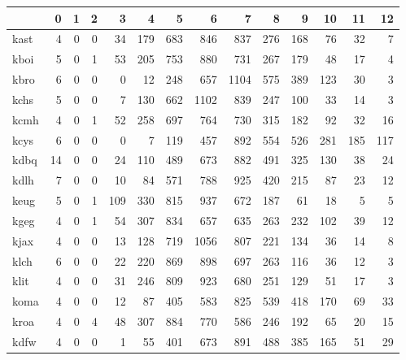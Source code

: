 \begin{tabular}{lrrrrrrrrrrrrr}
\toprule
{} &  0  &  1  &  2  &   3  &   4  &   5  &    6  &    7  &   8  &   9  &   10 &   11 &   12 \\
\midrule
kast &   4 &   0 &   0 &   34 &  179 &  683 &   846 &   837 &  276 &  168 &   76 &   32 &    7 \\
kboi &   5 &   0 &   1 &   53 &  205 &  753 &   880 &   731 &  267 &  179 &   48 &   17 &    4 \\
kbro &   6 &   0 &   0 &    0 &   12 &  248 &   657 &  1104 &  575 &  389 &  123 &   30 &    3 \\
kchs &   5 &   0 &   0 &    7 &  130 &  662 &  1102 &   839 &  247 &  100 &   33 &   14 &    3 \\
kcmh &   4 &   0 &   1 &   52 &  258 &  697 &   764 &   730 &  315 &  182 &   92 &   32 &   16 \\
kcys &   6 &   0 &   0 &    0 &    7 &  119 &   457 &   892 &  554 &  526 &  281 &  185 &  117 \\
kdbq &  14 &   0 &   0 &   24 &  110 &  489 &   673 &   882 &  491 &  325 &  130 &   38 &   24 \\
kdlh &   7 &   0 &   0 &   10 &   84 &  571 &   788 &   925 &  420 &  215 &   87 &   23 &   12 \\
keug &   5 &   0 &   1 &  109 &  330 &  815 &   937 &   672 &  187 &   61 &   18 &    5 &    5 \\
kgeg &   4 &   0 &   1 &   54 &  307 &  834 &   657 &   635 &  263 &  232 &  102 &   39 &   12 \\
kjax &   4 &   0 &   0 &   13 &  128 &  719 &  1056 &   807 &  221 &  134 &   36 &   14 &    8 \\
klch &   6 &   0 &   0 &   22 &  220 &  869 &   898 &   697 &  263 &  116 &   36 &   12 &    3 \\
klit &   4 &   0 &   0 &   31 &  246 &  809 &   923 &   680 &  251 &  129 &   51 &   17 &    3 \\
koma &   4 &   0 &   0 &   12 &   87 &  405 &   583 &   825 &  539 &  418 &  170 &   69 &   33 \\
kroa &   4 &   0 &   4 &   48 &  307 &  884 &   770 &   586 &  246 &  192 &   65 &   20 &   15 \\
kdfw &   4 &   0 &   0 &    1 &   55 &  401 &   673 &   891 &  488 &  385 &  165 &   51 &   29 \\
\bottomrule
\end{tabular}

